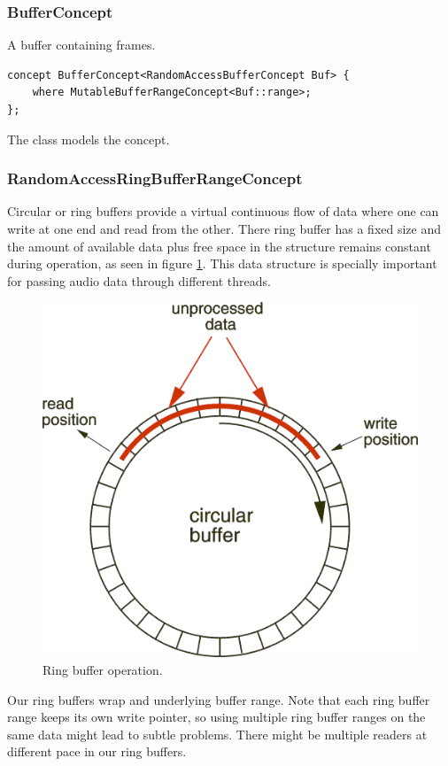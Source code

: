 \subsubsection{BufferConcept}

A buffer containing frames.

\begin{lstlisting}
concept BufferConcept<RandomAccessBufferConcept Buf> {
    where MutableBufferRangeConcept<Buf::range>;
};
\end{lstlisting}

The  class models the concept.

\subsubsection{RandomAccessRingBufferRangeConcept}

Circular or ring buffers provide a virtual
continuous flow of data where one can write at one end and read from
the other. There ring buffer has a fixed size and the amount of
available data plus free space in the structure remains constant
during operation, as seen in figure \ref{fig:ringbuf}. This data
structure is specially important for passing audio data through
different threads.

\begin{figure}[h!]
  \centering
  \includegraphics[width=.6\textwidth]{pic/ringbuffer.png}
  \caption{Ring buffer operation.}
  \label{fig:ringbuf}
\end{figure}

Our ring buffers wrap and underlying buffer range. Note that each ring
buffer range keeps its own write pointer, so using multiple ring
buffer ranges on the same data might lead to subtle problems. There
might be multiple readers at different pace in our ring buffers.

